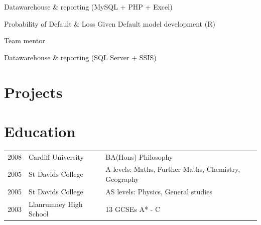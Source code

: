 \documentclass[]{single-page-resume}
\begin{document}
\begin{minipage}[t]{0.66\textwidth}
\begin{tightemize}
    \item Datawarehouse \& reporting (MySQL + PHP + Excel)
    \item Probability of Default \& Loss Given Default model development (R)
    \item Team mentor
 \end{tightemize}
\sectionsep

\begin{tightemize}
    \item Datawarehouse \& reporting  (SQL Server + SSIS)
    \end{tightemize}
\sectionsep

\sectionsep




\section{Projects}

\sectionsep

\sectionsep


\sectionsep


\section{Education} 
\begin{tabular}{lll}
2008 & Cardiff University  & BA(Hons) Philosophy\\
2005 & St Davids College  & A levels: Maths, Further Maths, Chemistry, Geography\\
2005 & St Davids College  & AS levels: Physics, General studies\\
2003 & Llanrumney High School & 13 GCSEs A* - C\\
\end{tabular}
\sectionsep


\end{minipage} 
\end{document}
